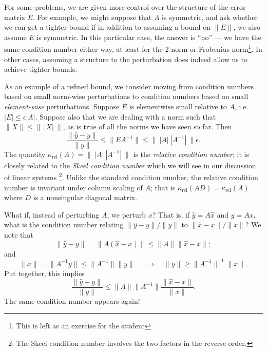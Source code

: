 \documentclass[12pt, leqno]{article} %
\begin{document}
For some problems, we are given more control over the structure of the
error matrix $E$.  For example, we might suppose that $A$ is symmetric,
and ask whether we can get a tighter bound if in addition to assuming a
bound on $\|E\|$, we also assume $E$ is symmetric.  In this particular
case, the answer is ``no'' --- we have the same condition number either
way, at least for the 2-norm or Frobenius norm\footnote{This is left as
an exercise for the student}.  In other cases, assuming a structure to
the perturbation does indeed allow us to achieve tighter bounds.

As an example of a refined bound, we consider moving from condition
numbers based on small norm-wise perturbations to condition numbers
based on small {\em element-wise} perturbations.  Suppose $E$ is
elementwise small relative to $A$, i.e.~$|E| \leq \epsilon |A|$.
Suppose also that we are dealing with a norm such
that $\|X\| \leq \|~|X|~\|$,
as is true of all the norms we have seen so far.  Then
\[
  \frac{\|\hat{y}-y\|}{\|y\|} \leq
  \|EA^{-1}\| \leq \|~|A|~|A^{-1}|~\| \epsilon.
\]
The quantity $\kappa_{\mathrm{rel}}(A) = \|~|A|~|A^{-1}|~\|$ is
the {\em relative condition number};
it is closely related to the {\em Skeel condition number} which we will
see in our discussion of linear systems%
\footnote{The Skeel condition number involves the two factors
in the reverse order.}.
Unlike the standard condition number, the relative condition number is
invariant under column scaling of $A$;
that is $\kappa_{\mathrm{rel}}(AD) = \kappa_{\mathrm{rel}}(A)$
where $D$ is a nonsingular diagonal matrix.

What if, instead of perturbing $A$, we perturb $x$?  That is, if
$\hat{y} = A \hat{x}$ and $y = Ax$, what is the condition number
relating $\|\hat{y}-y\|/\|y\|$ to $\|\hat{x}-x\|/\|x\|$?
We note that
\[
  \|\hat{y}-y\| = \|A(\hat{x}-x)\| \leq \|A\| \|\hat{x}-x\|;
\]
and
\[
  \|x\| = \|A^{-1} y\| \leq \|A^{-1}\| \|y\|
  \quad \implies \quad
  \|y\| \geq \|A^{-1}\|^{-1} \|x\|.
\]
Put together, this implies
\[
  \frac{\|\hat{y}-y\|}{\|y\|} \leq \|A\| \|A^{-1}\|
  \frac{\|\hat{x}-x\|}{\|x\|}.
\]
The same condition number appears again!
\end{document}
